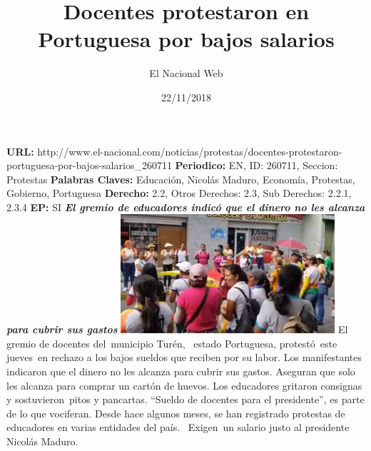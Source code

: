 \documentclass{article}%
\title{\textbf{Docentes protestaron en Portuguesa por bajos salarios}}%
\author{El Nacional Web}%
\date{22/11/2018}%
\begin{document}
%
\normalsize%
\maketitle%
\textbf{URL: }%
http://www.el{-}nacional.com/noticias/protestas/docentes{-}protestaron{-}portuguesa{-}por{-}bajos{-}salarios\_260711\newline%
%
\textbf{Periodico: }%
EN, %
ID: %
260711, %
Seccion: %
Protestas\newline%
%
\textbf{Palabras Claves: }%
Educación, Nicolás Maduro, Economía, Protestas, Gobierno, Portuguesa\newline%
%
\textbf{Derecho: }%
2.2, %
Otros Derechos: %
2.3, %
Sub Derechos: %
2.2.1, 2.3.4\newline%
%
\textbf{EP: }%
SI\newline%
\newline%
%
\textbf{\textit{El gremio de educadores indicó que el dinero no les alcanza para cubrir sus gastos}}%
\newline%
\newline%
%
\includegraphics[width=300px]{263.jpg}%
\newline%
%
El gremio de docentes del~municipio Turén, ~estado Portuguesa, protestó~este jueves~en rechazo a los bajos sueldos que reciben por su labor.%
\newline%
%
Los manifestantes indicaron que el dinero no les alcanza para cubrir sus gastos. Aseguran que solo les alcanza para comprar un cartón de huevos.%
\newline%
%
Los educadores gritaron consignas y sostuvieron~pitos y pancartas. “Sueldo de docentes para el presidente”, es parte de lo que vociferan.%
\newline%
%
Desde hace algunos meses, se han registrado protestas de educadores en varias entidades del país.~ Exigen~un salario justo al presidente Nicolás Maduro.%
\newline%
%
\end{document}
